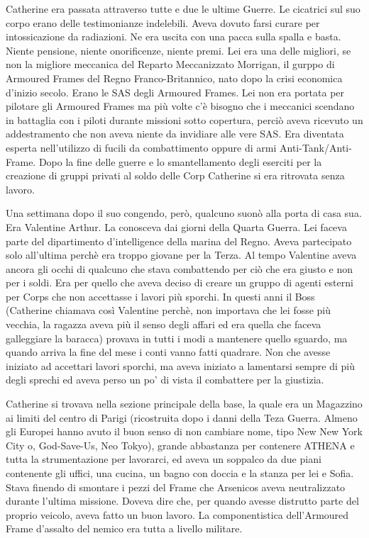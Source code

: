     Catherine era passata attraverso tutte e due le ultime Guerre. Le cicatrici sul suo corpo erano delle testimonianze
    indelebili. Aveva dovuto farsi curare per intossicazione da radiazioni. Ne era uscita con una pacca sulla spalla e
    basta. Niente pensione, niente onorificenze, niente premi. Lei era una delle migliori, se non la migliore meccanica
    del Reparto Meccanizzato Morrigan, il gurppo di Armoured Frames del Regno Franco-Britannico, nato dopo la crisi
    economica d'inizio secolo. Erano le SAS degli Armoured Frames. Lei non era portata per pilotare gli Armoured Frames
    ma più volte c'è bisogno che i meccanici scendano in battaglia con i piloti durante missioni sotto copertura, perciò
    aveva ricevuto un addestramento che non aveva niente da invidiare alle vere SAS. Era diventata esperta nell'utilizzo
    di fucili da combattimento oppure di armi Anti-Tank/Anti-Frame. Dopo la fine delle guerre e lo smantellamento degli
    eserciti per la creazione di gruppi privati al soldo delle Corp Catherine si era ritrovata senza lavoro.

    Una settimana dopo il suo congendo, però, qualcuno suonò alla porta di casa sua. Era Valentine Arthur. La conosceva
    dai giorni della Quarta Guerra. Lei faceva parte del dipartimento d'intelligence della marina del Regno. Aveva
    partecipato solo all'ultima perchè era troppo giovane per la Terza. Al tempo Valentine aveva ancora gli occhi di
    qualcuno che stava combattendo per ciò che era giusto e non per i soldi. Era per quello che aveva deciso di creare
    un gruppo di agenti esterni per Corps che non accettasse i lavori più sporchi. In questi anni il Boss (Catherine
    chiamava così Valentine perchè, non importava che lei fosse più vecchia, la ragazza aveva più il senso degli affari
    ed era quella che faceva galleggiare la baracca) provava in tutti i modi a mantenere quello sguardo, ma quando
    arriva la fine del mese i conti vanno fatti quadrare. Non che avesse iniziato ad accettari lavori sporchi, ma aveva
    iniziato a lamentarsi sempre di più degli sprechi ed aveva perso un po' di vista il combattere per la giustizia.

    Catherine si trovava nella sezione principale della base, la quale era un Magazzino ai limiti del centro di Parigi
    (ricostruita dopo i danni della Teza Guerra. Almeno gli Europei hanno avuto il buon senso di non cambiare nome, tipo
    New New York City o, God-Save-Us, Neo Tokyo), grande abbastanza per contenere ATHENA e tutta la strumentazione per
    lavorarci, ed aveva un soppalco da due piani contenente gli uffici, una cucina, un bagno con doccia e la stanza per
    lei e Sofia. Stava finendo di smontare i pezzi del Frame che Arsenicos aveva neutralizzato durante l'ultima
    missione. Doveva dire che, per quando avesse distrutto parte del proprio veicolo, aveva fatto un buon lavoro. La
    componentistica dell'Armoured Frame d'assalto del nemico era tutta a livello militare.

